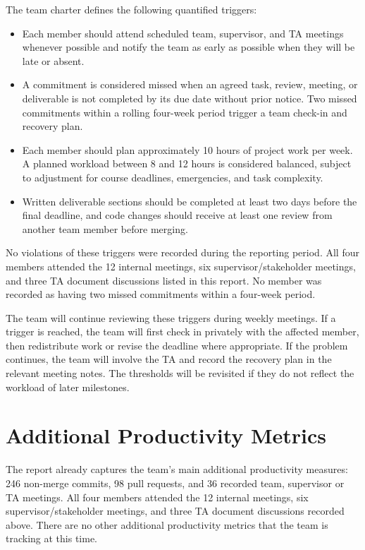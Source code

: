 \documentclass{article}
\begin{document}
The team charter defines the following quantified triggers:

\begin{itemize}
    \item Each member should attend scheduled team, supervisor, and TA meetings
    whenever possible and notify the team as early as possible when they will be
    late or absent.
    \item A commitment is considered missed when an agreed task, review, meeting,
    or deliverable is not completed by its due date without prior notice. Two
    missed commitments within a rolling four-week period trigger a team check-in
    and recovery plan.
    \item Each member should plan approximately 10 hours of project work per
    week. A planned workload between 8 and 12 hours is considered balanced,
    subject to adjustment for course deadlines, emergencies, and task complexity.
    \item Written deliverable sections should be completed at least two days
    before the final deadline, and code changes should receive at least one
    review from another team member before merging.
\end{itemize}

No violations of these triggers were recorded during the reporting period. All
four members attended the 12 internal meetings, six supervisor/stakeholder
meetings, and three TA document discussions listed in this report. No member
was recorded as having two missed commitments within a four-week period.

The team will continue reviewing these triggers during weekly meetings. If a
trigger is reached, the team will first check in privately with the affected
member, then redistribute work or revise the deadline where appropriate. If the
problem continues, the team will involve the TA and record the recovery plan in
the relevant meeting notes. The thresholds will be revisited if they do not
reflect the workload of later milestones.

\section{Additional Productivity Metrics}

The report already captures the team's main additional productivity measures:
246 non-merge commits, 98 pull requests, and 36 recorded team, supervisor or
TA meetings. All four members attended the 12 internal meetings, six
supervisor/stakeholder meetings, and three TA document discussions recorded
above. There are no other additional productivity metrics that the team is tracking at this time.
\end{document}

